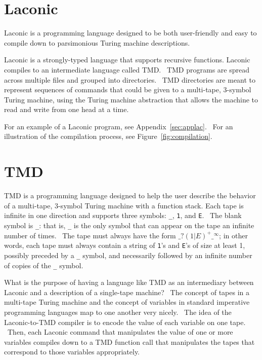 \documentclass[11pt]{article}
\begin{document}
\section{Laconic}

Laconic is a programming language designed to be both user-friendly and easy to compile down to parsimonious Turing machine descriptions.

Laconic is a strongly-typed language that supports recursive functions. Laconic compiles to an intermediate language called TMD. \ TMD programs are spread across multiple files and grouped into directories. \ TMD directories are meant to represent sequences of commands that could be given to a multi-tape, $3$-symbol Turing machine, using the Turing machine abstraction that allows the machine to read and write from one head at a time.

For an example of a Laconic program, see Appendix~\ref{sec:applac}. \ For an illustration of the compilation process, see Figure~\ref{fig:compilation}.

\section{TMD}

TMD is a programming language designed to help the user describe the behavior of a multi-tape, $3$-symbol Turing machine with a function stack. Each tape is infinite in one direction and supports three symbols: \texttt{\_}, \texttt{1}, and \texttt{E}. \ The blank symbol is \texttt{\_}: that is, \texttt{\_} is the only symbol that can appear on the tape an infinite number of times. \ The tape must always have the form $\texttt{\_}?(1|E)^+\texttt{\_}^{\infty}$; in other words, each tape must always contain a string of \texttt{1}'s and \texttt{E}'s of size at least 1, possibly preceded by a \texttt{\_} symbol, and necessarily followed by an infinite number of copies of the \texttt{\_} symbol.

What is the purpose of having a language like TMD as an intermediary between Laconic and a description of a single-tape machine? \ The concept of tapes in a multi-tape Turing machine and the concept of variables in standard imperative programming languages map to one another very nicely. \ The idea of the Laconic-to-TMD compiler is to encode the value of each variable on one tape. \ Then, each Laconic command that manipulates the value of one or more variables compiles down to a TMD function call that manipulates the tapes that correspond to those variables appropriately.
\end{document}
